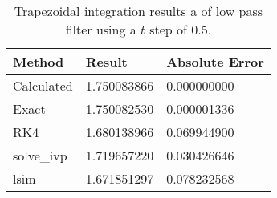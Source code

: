 \begin{singlespace}
\begin{table}[H]
	\centering
	\begin{tabular}{@{} l l l  @{}} 	
		\toprule %
		\footnotesize %
		\raggedright %
		Method	&		Result & Absolute Error		\\
		\midrule		
%
Calculated& 	1.750083866&	0.000000000\\
Exact& 	1.750082530&	0.000001336\\
RK4&	1.680138966&	0.069944900\\
solve\_ivp& 	1.719657220	&0.030426646\\
lsim&	1.671851297&	0.078232568\\
%
		\bottomrule
	\end{tabular}
	\caption{Trapezoidal integration results a of low pass filter using a $t$ step of 0.5.}
	\label{tab: trap lowpass res}
\end{table}
\end{singlespace}
	
	
